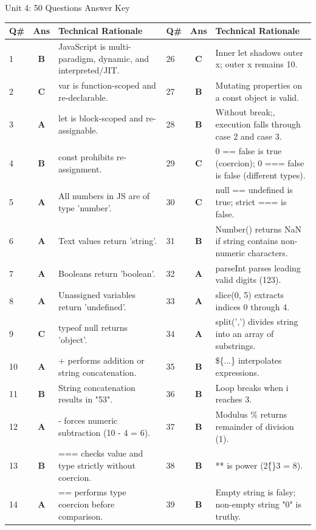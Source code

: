 \begin{answerkeytable}{Unit 4: 50 Questions Answer Key}
\begin{tabularx}{\textwidth}{l c X l c X}
\toprule
\textbf{Q\#} & \textbf{Ans} & \textbf{Technical Rationale} & \textbf{Q\#} & \textbf{Ans} & \textbf{Technical Rationale} \\
\midrule
1 & \textbf{B} & JavaScript is multi-paradigm, dynamic, and interpreted/JIT. & 26 & \textbf{C} & Inner let shadows outer x; outer x remains 10. \\
2 & \textbf{C} & var is function-scoped and re-declarable. & 27 & \textbf{B} & Mutating properties on a const object is valid. \\
3 & \textbf{A} & let is block-scoped and re-assignable. & 28 & \textbf{B} & Without break;, execution falls through case 2 and case 3. \\
4 & \textbf{B} & const prohibits re-assignment. & 29 & \textbf{C} & 0 == false is true (coercion); 0 === false is false (different types). \\
5 & \textbf{A} & All numbers in JS are of type 'number'. & 30 & \textbf{C} & null == undefined is true; strict === is false. \\
6 & \textbf{A} & Text values return 'string'. & 31 & \textbf{B} & Number() returns NaN if string contains non-numeric characters. \\
7 & \textbf{A} & Booleans return 'boolean'. & 32 & \textbf{A} & parseInt parses leading valid digits (123). \\
8 & \textbf{A} & Unassigned variables return 'undefined'. & 33 & \textbf{A} & slice(0, 5) extracts indices 0 through 4. \\
9 & \textbf{C} & typeof null returns 'object'. & 34 & \textbf{A} & split(',') divides string into an array of substrings. \\
10 & \textbf{A} & + performs addition or string concatenation. & 35 & \textbf{B} & \$\{...\} interpolates expressions. \\
11 & \textbf{B} & String concatenation results in "53". & 36 & \textbf{B} & Loop breaks when i reaches 3. \\
12 & \textbf{A} & - forces numeric subtraction (10 - 4 = 6). & 37 & \textbf{B} & Modulus \% returns remainder of division (1). \\
13 & \textbf{B} & === checks value and type strictly without coercion. & 38 & \textbf{B} & ** is power (2\^\{\}3 = 8). \\
14 & \textbf{A} & == performs type coercion before comparison. & 39 & \textbf{B} & Empty string is falsy; non-empty string "0" is truthy. \\

\end{tabularx}
\end{answerkeytable}
